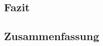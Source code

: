 \documentclass[12pt,a4paper,titlepage,listof=totoc,bibliography=totoc,chapteratlists=0pt]{scrreprt}
\begin{document}
\begin{spacing}{1}
	\chapter{Fazit}
	\end{spacing}
	


\begin{spacing}{1}
\chapter{Zusammenfassung}
\end{spacing}


\newpage
{}
\setcounter{page}{\value{RPages}}

\glsnogroupskiptrue
\printglossary[title=Glossar,toctitle=Glossar] %
\listoffigures
\listoftables
\lstlistoflistings
\appendix
{}

\end{document}
